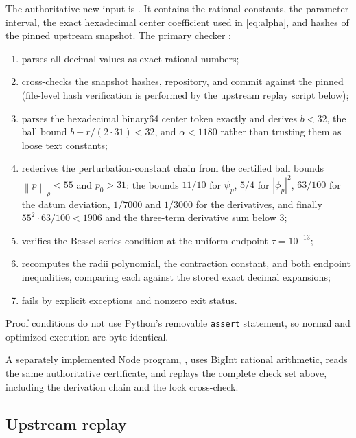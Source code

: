 \documentclass[11pt]{amsart}
\newcommand{\norm}[1]{\left\lVert #1\right\rVert}
\newcommand{\abs}[1]{\left\lvert #1\right\rvert}
\begin{document}
The authoritative new input is
.  It contains the
rational constants, the parameter interval, the exact hexadecimal center
coefficient used in \eqref{eq:alpha}, and hashes of the pinned upstream
snapshot.  The primary checker
:
\begin{enumerate}[leftmargin=2.2em]
  \item parses all decimal values as exact rational numbers;
  \item cross-checks the snapshot hashes, repository, and commit against
  the pinned  (file-level hash verification is
  performed by the upstream replay script below);
  \item parses the hexadecimal binary64 center token exactly and derives
  $b<32$, the ball bound $b+r/(2\cdot31)<32$, and $\alpha<1180$ rather
  than trusting them as loose text constants;
  \item rederives the perturbation-constant chain from the certified ball
  bounds $\norm p_\rho<55$ and $p_0>31$: the bounds $11/10$ for
  $\psi_p$, $5/4$ for $\abs{\phi_p}^2$, $63/100$ for the datum
  deviation, $1/7000$ and $1/3000$ for the derivatives, and finally
  $55^2\cdot63/100<1906$ and the three-term derivative sum below $3$;
  \item verifies the Bessel-series condition at the uniform endpoint
  $\tau=10^{-13}$;
  \item recomputes the radii polynomial, the contraction constant, and
  both endpoint inequalities, comparing each against the stored exact
  decimal expansions;
  \item fails by explicit exceptions and nonzero exit status.
\end{enumerate}
Proof conditions do not use Python's removable \texttt{assert} statement, so
normal and optimized execution are byte-identical.

A separately implemented Node program,
, uses BigInt rational arithmetic,
reads the same authoritative certificate, and replays the complete check
set above, including the derivation chain and the lock cross-check.

\subsection{Upstream replay}
\end{document}
